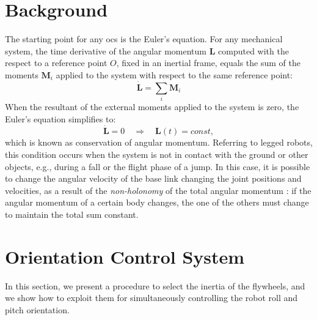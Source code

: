 \documentclass[letterpaper, 10 pt, conference]{ieeeconf}      %
\begin{document}
\section{Background}
\label{sec:background}
The starting point for any \gls{ocs} is the Euler's equation. For any mechanical system, the time derivative of the angular momentum $\bm{L}$ computed with the respect to a reference point $O$, fixed in an inertial frame, equals the sum of the moments $\bm{M}_i$ applied to the system with respect to the same reference point:
\begin{equation}
\dot{\bm{L}} = \sum_i \bm{M}_i
\end{equation}
When the resultant of the external moments applied to the system is zero, the Euler's equation simplifies to:
\begin{equation}
\dot{\bm{L}} = 0 \quad \Rightarrow \quad \bm{L}(t) = const,
\label{eq:cons_ang_mom}
\end{equation}
which is known as conservation of angular momentum.
Referring to legged robots, this condition occurs when the system is not in contact with the ground or other objects, e.g., during a fall or the flight phase of a jump.
In this case, it is possible to change the angular velocity of the base link changing the joint positions and velocities, as a result of the \textit{non-holonomy} of the total angular momentum \cite{Wieber16}: if the angular momentum of a certain body changes, the one of the others must change to maintain the total sum constant.


\section{Orientation Control System}
\label{sec:ocs}
In this section, we present a procedure to select the inertia of the flywheels, and we show how to exploit them for simultaneously controlling the robot roll and pitch orientation.
\end{document}

